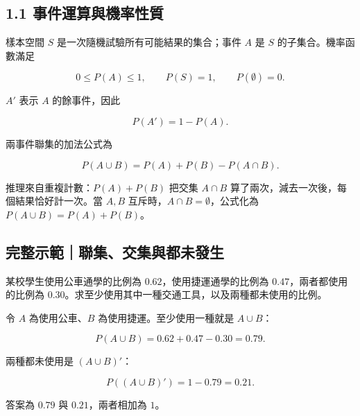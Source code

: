 \documentclass[11pt,a4paper]{article}
\begin{document}
\subsection{1.1 事件運算與機率性質}\label{ux4e8bux4ef6ux904bux7b97ux8207ux6a5fux7387ux6027ux8cea}

樣本空間 \(S\) 是一次隨機試驗所有可能結果的集合；事件 \(A\) 是 \(S\) 的子集合。機率函數滿足

\[
0\le P(A)\le1,
\qquad
P(S)=1,
\qquad
P(\emptyset)=0.
\]

\(A'\) 表示 \(A\) 的餘事件，因此

\[
P(A')=1-P(A).
\]

兩事件聯集的加法公式為

\[
\boxed{P(A\cup B)=P(A)+P(B)-P(A\cap B)}.
\]

推理來自重複計數：\(P(A)+P(B)\) 把交集 \(A\cap B\) 算了兩次，減去一次後，每個結果恰好計一次。當 \(A,B\) 互斥時，\(A\cap B=\emptyset\)，公式化為 \(P(A\cup B)=P(A)+P(B)\)。

\begin{HandoutWorkedExample}

\subsection{完整示範｜聯集、交集與都未發生}\label{ux5b8cux6574ux793aux7bc4ux806fux96c6ux4ea4ux96c6ux8207ux90fdux672aux767cux751f}

某校學生使用公車通學的比例為 \(0.62\)，使用捷運通學的比例為 \(0.47\)，兩者都使用的比例為 \(0.30\)。求至少使用其中一種交通工具，以及兩種都未使用的比例。

令 \(A\) 為使用公車、\(B\) 為使用捷運。至少使用一種就是 \(A\cup B\)：

\[
P(A\cup B)=0.62+0.47-0.30=0.79.
\]

兩種都未使用是 \((A\cup B)'\)：

\[
P((A\cup B)')=1-0.79=0.21.
\]

答案為 \(\boxed{0.79}\) 與 \(\boxed{0.21}\)，兩者相加為 \(1\)。

\end{HandoutWorkedExample}
\end{document}
